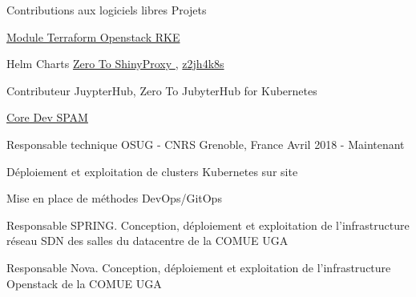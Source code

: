 

\begin{cventries}

  \cventry
    {Contributions aux logiciels libres} %
    {Projets}
    {}
    {}
    {
      \begin{cvitems} %
        \item {\href{https://github.com/remche/terraform-openstack-rke}{Module Terraform Openstack RKE \faGithub}}
        \item {Helm Charts \href{https://github.com/remche/zero-to-shinyproxy}{Zero To ShinyProxy \faGithub}, \href{https://github.com/remche/z2jh4k8s}{z2jh4k8s \faGithub}}
        \item {Contributeur JuypterHub, Zero To JubyterHub for Kubernetes}
        \item {\href{https://ttk.gricad-pages.univ-grenoble-alpes.fr/spam/intro.html}{Core Dev SPAM \faGlobe}}
      \end{cvitems}
    }

  \cventry
    {Responsable technique} %
    {OSUG - CNRS} %
    {Grenoble, France} %
    {Avril 2018 - Maintenant} %
    {
      \begin{cvitems} %
        \item {Déploiement et exploitation de clusters Kubernetes sur site}
        \item {Mise en place de méthodes DevOps/GitOps}
        \item {Responsable SPRING. Conception, déploiement et exploitation de l'infrastructure réseau SDN des salles du datacentre de la COMUE UGA}
        \item {Responsable Nova. Conception, déploiement et exploitation de l'infrastructure Openstack de la COMUE UGA}
      \end{cvitems}
    }


\end{cventries}
